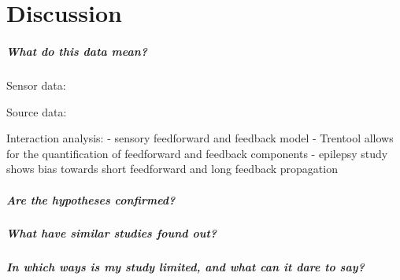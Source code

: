 \chapter{Discussion}

\paragraph{What do this data mean?}
Sensor data:

Source data:

Interaction analysis:
- sensory feedforward and feedback model
- Trentool allows for the quantification of feedforward and feedback components
- epilepsy study shows bias towards short feedforward and long feedback propagation

\paragraph{Are the hypotheses confirmed?}

\paragraph{What have similar studies found out?}

\paragraph{In which ways is my study limited, and what can it dare to say?}